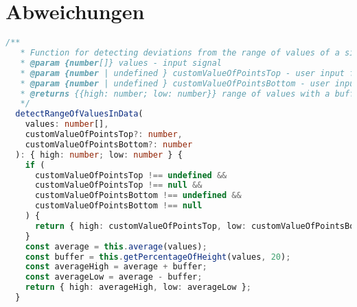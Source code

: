 \section{Abweichungen}\label{appendix:trend-detection-code:abweichungen}
\begin{lstlisting}[language=Typescript]
  /**
   * Function for detecting deviations from the range of values of a signal.
   * @param {number[]} values - input signal
   * @param {number | undefined } customValueOfPointsTop - user input for custom Value of Points TOP
   * @param {number | undefined } customValueOfPointsBottom - user input for custom Value of Points BOTTOM
   * @returns {{high: number; low: number}} range of values with a buffer
   */
  detectRangeOfValuesInData(
    values: number[],
    customValueOfPointsTop?: number,
    customValueOfPointsBottom?: number
  ): { high: number; low: number } {
    if (
      customValueOfPointsTop !== undefined &&
      customValueOfPointsTop !== null &&
      customValueOfPointsBottom !== undefined &&
      customValueOfPointsBottom !== null
    ) {
      return { high: customValueOfPointsTop, low: customValueOfPointsBottom };
    }
    const average = this.average(values);
    const buffer = this.getPercentageOfHeight(values, 20);
    const averageHigh = average + buffer;
    const averageLow = average - buffer;
    return { high: averageHigh, low: averageLow };
  }

\end{lstlisting}